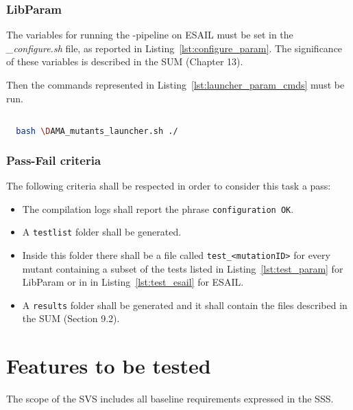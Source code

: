 \subsubsection{LibParam}

The variables for running the \DAMA-pipeline on ESAIL must be set in the \emph{\DAMA\_configure.sh} file, as reported in Listing~\ref{lst:configure_param}. The significance of these variables is described in the SUM (Chapter 13).

Then the commands represented in Listing~\ref{lst:launcher_param_cmds} must be run.

  \begin{lstlisting}[language=bash, label={lst:launcher_param_cmds}]

  bash \DAMA_mutants_launcher.sh ./

  \end{lstlisting}

\subsubsection{Pass-Fail criteria}

The following criteria shall be respected in order to consider this task a pass:

\begin{itemize}
  \item The compilation logs shall report the phrase \texttt{configuration OK}.
  \item A \texttt{testlist} folder shall be generated.
  \item Inside this folder there shall be a file called \texttt{test\_<mutationID>} for every mutant containing a subset of the tests listed in Listing~\ref{lst:test_param} for LibParam or in in Listing~\ref{lst:test_esail} for ESAIL.
  \item A \texttt{results} folder shall be generated and it shall contain the files described in the SUM (Section 9.2).
\end{itemize}

\section{Features to be tested}
The scope of the SVS includes all baseline requirements expressed in the SSS.


